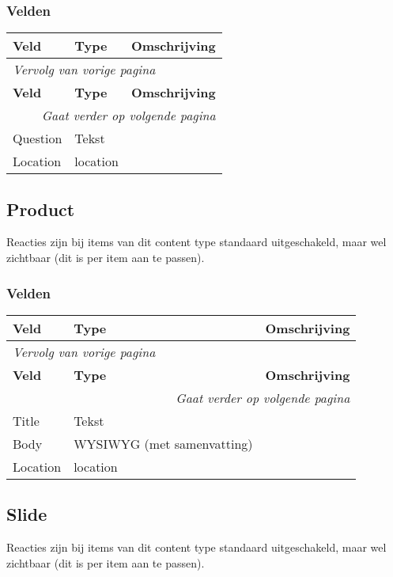 \subsubsection{Velden}
  \begin{longtable}{| p{3.75cm}|p{3.75cm}|p{7.50cm}|}
  \hline
  \rowcolor{tableheader}
  \textbf{Veld} & \textbf{Type} & \textbf{Omschrijving}  \tabularnewline
  \hline
\endfirsthead
\multicolumn{3}{l}{\textit{Vervolg van vorige pagina}} \\
\hline
\rowcolor{tableheader}
  \textbf{Veld} & \textbf{Type} & \textbf{Omschrijving}  \tabularnewline
  \hline
\hline
\endhead
\multicolumn{3}{r}{\textit{Gaat verder op volgende pagina}} \\
\endfoot
\hline
\endlastfoot
  \raggedright{Question} & \raggedright{Tekst} & \raggedright{}  \tabularnewline
  \hline
  \raggedright{Location} & \raggedright{location} & \raggedright{}  \tabularnewline
  \hline
  \end{longtable}

\subsection{Product}
\label{sec:content-product}
Reacties zijn bij items van dit content type standaard uitgeschakeld, maar wel zichtbaar (dit is per item aan te passen).

\subsubsection{Velden}
  \begin{longtable}{| p{3.75cm}|p{3.75cm}|p{7.50cm}|}
  \hline
  \rowcolor{tableheader}
  \textbf{Veld} & \textbf{Type} & \textbf{Omschrijving}  \tabularnewline
  \hline
\endfirsthead
\multicolumn{3}{l}{\textit{Vervolg van vorige pagina}} \\
\hline
\rowcolor{tableheader}
  \textbf{Veld} & \textbf{Type} & \textbf{Omschrijving}  \tabularnewline
  \hline
\hline
\endhead
\multicolumn{3}{r}{\textit{Gaat verder op volgende pagina}} \\
\endfoot
\hline
\endlastfoot
  \raggedright{Title} & \raggedright{Tekst} & \raggedright{}  \tabularnewline
  \hline
  \raggedright{Body} & \raggedright{WYSIWYG (met samenvatting)} & \raggedright{}  \tabularnewline
  \hline
  \raggedright{Location} & \raggedright{location} & \raggedright{}  \tabularnewline
  \hline
  \end{longtable}

\subsection{Slide}
\label{sec:content-slide}
Reacties zijn bij items van dit content type standaard uitgeschakeld, maar wel zichtbaar (dit is per item aan te passen).

